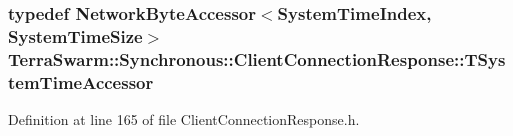 \hypertarget{class_terra_swarm_1_1_synchronous_1_1_client_connection_response_ad4b8d0ca4f4c2bbb9cfc704e6b250e57}{
\subsubsection[{T\-System\-Time\-Accessor}]{\setlength{\rightskip}{0pt plus 5cm}typedef {\bf Network\-Byte\-Accessor}$<${\bf System\-Time\-Index}, {\bf System\-Time\-Size}$>$ {\bf Terra\-Swarm\-::\-Synchronous\-::\-Client\-Connection\-Response\-::\-T\-System\-Time\-Accessor}\hspace{0.3cm}{\ttfamily [private]}}}\label{class_terra_swarm_1_1_synchronous_1_1_client_connection_response_ad4b8d0ca4f4c2bbb9cfc704e6b250e57}


Definition at line 165 of file Client\-Connection\-Response.\-h.



